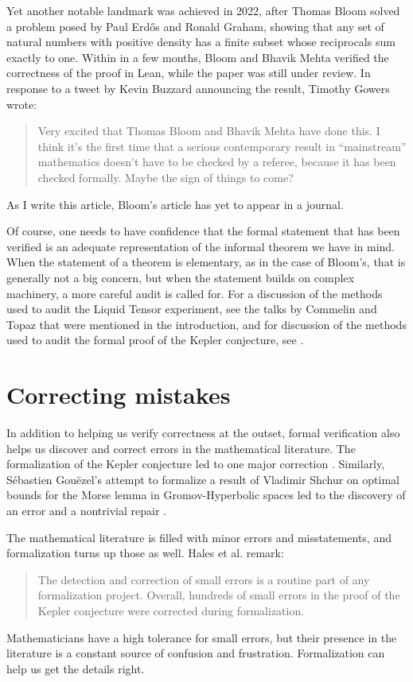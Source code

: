\documentclass[12pt]{amsart}
\theoremstyle{definition}
\theoremstyle{remark}
\numberwithin{equation}{section}
\begin{document}
Yet another notable landmark was achieved in 2022, after Thomas Bloom solved a problem posed by Paul Erd\H{o}s and Ronald Graham, showing that any set of natural numbers with positive density has a finite subset whose reciprocals sum exactly to one. Within in a few months, Bloom and Bhavik Mehta verified the correctness of the proof in Lean, while the paper was still under review. In response to a tweet by Kevin Buzzard announcing the result, Timothy Gowers wrote:
\begin{quote}
  Very excited that Thomas Bloom and Bhavik Mehta have done this. I think it's the first time that a serious contemporary result in ``mainstream'' mathematics doesn't have to be checked by a referee, because it has been checked formally. Maybe the sign of things to come?
\end{quote}
As I write this article, Bloom's article has yet to appear in a journal.

Of course, one needs to have confidence that the formal statement that has been verified is an adequate representation of the informal theorem we have in mind. When the statement of a theorem is elementary, as in the case of Bloom's, that is generally not a big concern, but when the statement builds on complex machinery, a more careful audit is called for. For a discussion of the methods used to audit the Liquid Tensor experiment, see the talks by Commelin and Topaz that were mentioned in the introduction, and for discussion of the methods used to audit the formal proof of the Kepler conjecture, see \cite[Section 10]{hales:et:al:17}.


\section{Correcting mistakes}

In addition to helping us verify correctness at the outset, formal verification also helps us discover and correct errors in the mathematical literature. The formalization of the Kepler conjecture led to one major correction \cite{hales:et:al:10}. Similarly, S\'ebastien Gou\"ezel's attempt to formalize a result of Vladimir Shchur on optimal bounds for the Morse lemma in Gromov-Hyperbolic spaces led to the discovery of an error and a nontrivial repair \cite{gouezel:shchur:19}.

The mathematical literature is filled with minor errors and misstatements, and formalization turns up those as well. Hales et al. remark:
\begin{quote}
The detection and correction of
small errors is a routine part of any formalization project. Overall, hundreds of small errors
in the proof of the Kepler conjecture were corrected during formalization. \cite[Section 4.3]{hales:et:al:17}
\end{quote}
Mathematicians have a high tolerance for small errors, but their presence in the literature is a constant source of confusion and frustration. Formalization can help us get the details right.
\end{document}
